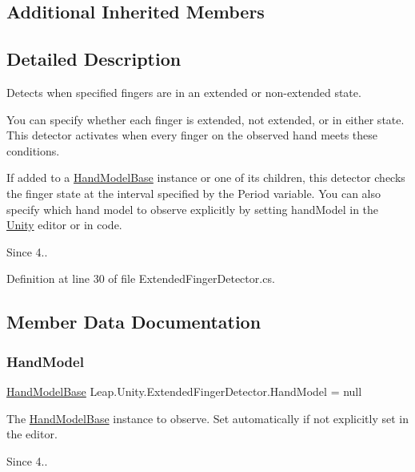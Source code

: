 \subsection*{Additional Inherited Members}


\subsection{Detailed Description}
Detects when specified fingers are in an extended or non-\/extended state.

You can specify whether each finger is extended, not extended, or in either state. This detector activates when every finger on the observed hand meets these conditions.

If added to a \mbox{\hyperlink{class_leap_1_1_unity_1_1_hand_model_base}{Hand\+Model\+Base}} instance or one of its children, this detector checks the finger state at the interval specified by the Period variable. You can also specify which hand model to observe explicitly by setting hand\+Model in the \mbox{\hyperlink{namespace_leap_1_1_unity}{Unity}} editor or in code.

\begin{DoxySince}{Since}
4.. 
\end{DoxySince}


Definition at line 30 of file Extended\+Finger\+Detector.\+cs.



\subsection{Member Data Documentation}
\mbox{\label{class_leap_1_1_unity_1_1_extended_finger_detector_a1ce4d883132d6a9fa84370ff12c8b0bc}} 
\subsubsection{\texorpdfstring{HandModel}{HandModel}}
{\footnotesize\ttfamily \mbox{\hyperlink{class_leap_1_1_unity_1_1_hand_model_base}{Hand\+Model\+Base}} Leap.\+Unity.\+Extended\+Finger\+Detector.\+Hand\+Model = null}

The \mbox{\hyperlink{class_leap_1_1_unity_1_1_hand_model_base}{Hand\+Model\+Base}} instance to observe. Set automatically if not explicitly set in the editor. \begin{DoxySince}{Since}
4.. 
\end{DoxySince}


